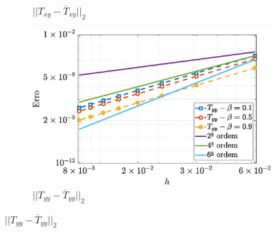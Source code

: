 \begin{figure}[H]
\begin{subfigure}[b]{.47\textwidth}
        \caption{$||T_{xy} - \overline{T}_{xy}||_{2}$}
        \label{error_txy_2nd_Case1_giesekus_alphaG_0.5}
    \end{subfigure}
    \qquad
    \begin{subfigure}[b]{.47\textwidth}
        \includegraphics[width=\textwidth]{figures/Case12/Giesekus/Errors/NormErr_2nd_Re_100_Wi_1_epsilon_0_xi_0_alphaG_0.1_Dt_1e-06_at_0.05_tipsim_1_MMS_12_Tyy.eps}
        \caption{$||T_{yy} - \overline{T}_{yy}||_{2}$}
        \label{error_tyy_2nd_Case1_giesekus_alphaG_0.5}
    \end{subfigure}
    \fautor
\end{figure}

